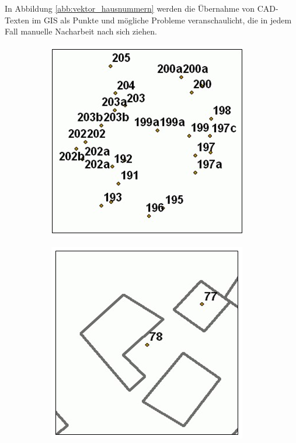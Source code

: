 In Abbildung \ref{abb:vektor_hausnummern} werden die Übernahme von CAD-Texten im GIS als Punkte und mögliche Probleme veranschaulicht, die in jedem Fall manuelle Nacharbeit nach sich ziehen.

\begin{figure}[h!tbp]\vspace{1cm}
\centering
\begin{subfigure}{.3\textwidth}
  \centering
  \includegraphics[width=\linewidth]{bilder/vektor_hausnummernA}
  \caption{}
\end{subfigure}\hspace{1cm}%
\begin{subfigure}{.3\textwidth}
  \centering
  \includegraphics[width=\linewidth]{bilder/vektor_hausnummernB}

\end{subfigure}
\end{figure}
